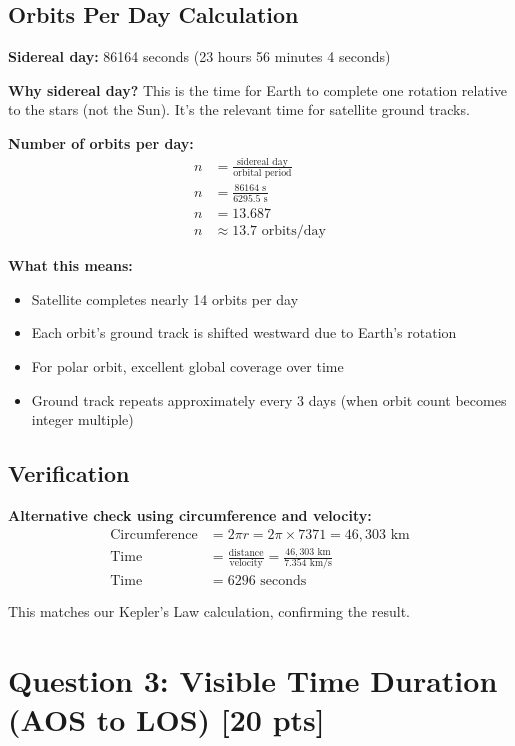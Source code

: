 \documentclass[11pt,letterpaper]{article}
\begin{document}
\subsection{Orbits Per Day Calculation}

\textbf{Sidereal day:} 86164 seconds (23 hours 56 minutes 4 seconds)

\textbf{Why sidereal day?} This is the time for Earth to complete one rotation relative to the stars (not the Sun). It's the relevant time for satellite ground tracks.

\textbf{Number of orbits per day:}
\begin{align}
n &= \frac{\text{sidereal day}}{\text{orbital period}} \\
n &= \frac{86164 \text{ s}}{6295.5 \text{ s}} \\
n &= 13.687 \\
n &\approx 13.7 \text{ orbits/day}
\end{align}

\textbf{What this means:}
\begin{itemize}
    \item Satellite completes nearly 14 orbits per day
    \item Each orbit's ground track is shifted westward due to Earth's rotation
    \item For polar orbit, excellent global coverage over time
    \item Ground track repeats approximately every 3 days (when orbit count becomes integer multiple)
\end{itemize}

\subsection{Verification}

\textbf{Alternative check using circumference and velocity:}
\begin{align}
\text{Circumference} &= 2\pi r = 2\pi \times 7371 = 46,303 \text{ km} \\
\text{Time} &= \frac{\text{distance}}{\text{velocity}} = \frac{46,303 \text{ km}}{7.354 \text{ km/s}} \\
\text{Time} &= 6296 \text{ seconds}
\end{align}

This matches our Kepler's Law calculation, confirming the result.

\section{Question 3: Visible Time Duration (AOS to LOS) [20 pts]}
\end{document}
